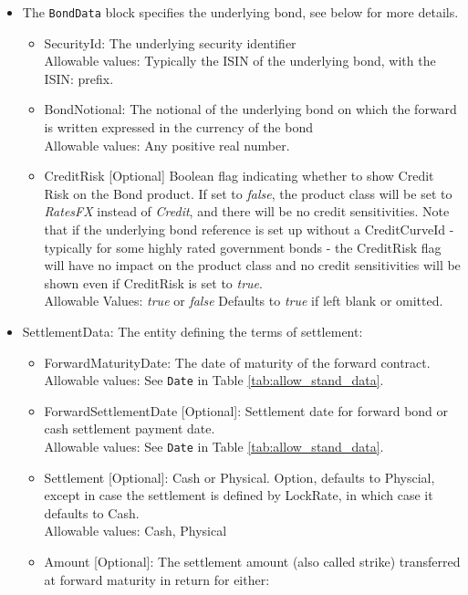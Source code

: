 \begin{itemize}
   \item The {\tt BondData} block specifies the underlying bond, see below for more details.
   \begin{itemize}
     \item SecurityId: The underlying security identifier \\    
        Allowable values:  Typically the ISIN of the underlying bond, with the ISIN: prefix. 
     \item BondNotional: The notional of the underlying bond on which the forward is written expressed in the currency of
       the bond \\
        Allowable values:  Any positive real number.
    \item CreditRisk [Optional] Boolean flag indicating whether to show Credit Risk on the Bond product. If set to \emph{false}, the product class will be set to \emph{RatesFX} instead of \emph{Credit}, and there will be no credit sensitivities. Note that if the underlying bond reference is set up without a CreditCurveId - typically for some highly rated government bonds -  the CreditRisk flag will have no impact on the product class and no credit sensitivities will be shown even if CreditRisk is set to \emph{true}.\\
  Allowable Values: \emph{true} or \emph{false} Defaults to \emph{true} if left blank or omitted.    
   \end{itemize}
   \item SettlementData: The entity defining the terms of settlement:
   \begin{itemize}
       \item ForwardMaturityDate: The date of maturity of the forward contract. \\
         Allowable values: See \lstinline!Date! in Table \ref{tab:allow_stand_data}.
       \item ForwardSettlementDate [Optional]: Settlement date for forward bond or cash settlement payment date.  \\
         Allowable values: See \lstinline!Date! in Table \ref{tab:allow_stand_data}.
       \item Settlement [Optional]: Cash or Physical. Option, defaults to Physcial, except in case the settlement is
         defined by LockRate, in which case it defaults to Cash. \\
         Allowable values: Cash, Physical
       \item Amount [Optional]: The settlement amount (also called strike) transferred at forward maturity in return for either:\\

\end{itemize}
\end{itemize}
